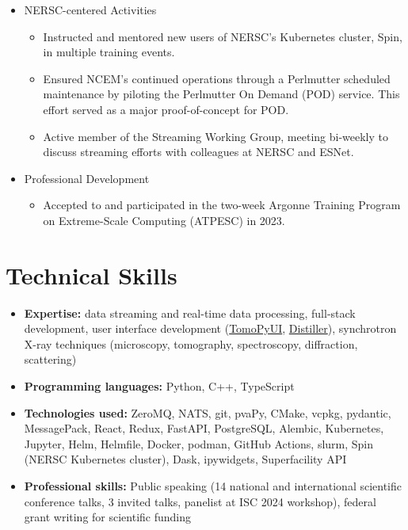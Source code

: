 \documentclass[11pt]{article} %
\begin{document}
\begin{itemize}
  \item NERSC-centered Activities
    \begin{itemize}
      \item Instructed and mentored new users of NERSC's Kubernetes cluster, Spin, in multiple training events.
      \item Ensured NCEM's continued operations through a Perlmutter scheduled maintenance by piloting the Perlmutter On Demand (POD) service. This effort served as a major proof-of-concept for POD.\
      \item Active member of the Streaming Working Group, meeting bi-weekly to discuss streaming efforts with colleagues at NERSC and ESNet.
    \end{itemize}

  \item Professional Development
    \begin{itemize}
      \item Accepted to and participated in the two-week Argonne Training Program on Extreme-Scale Computing (ATPESC) in 2023.
    \end{itemize}
\end{itemize}

\section{Technical Skills}

\begin{itemize}
  \item \textbf{Expertise:} data streaming and real-time data processing, full-stack development, user interface development (\href{https://onlinelibrary.wiley.com/iucr/doi/10.1107/S1600577524003989}{TomoPyUI}, \href{https://github.com/OpenChemistry/distiller}{Distiller}), synchrotron X-ray techniques (microscopy, tomography, spectroscopy, diffraction, scattering)
  \item \textbf{Programming languages:} Python, C++, TypeScript
  \item \textbf{Technologies used:} ZeroMQ, NATS, git, pvaPy, CMake, vcpkg, pydantic, MessagePack, React, Redux, FastAPI, PostgreSQL, Alembic, Kubernetes, Jupyter, Helm, Helmfile, Docker, podman, GitHub Actions, slurm, Spin (NERSC Kubernetes cluster), Dask, ipywidgets, Superfacility API
  \item \textbf{Professional skills:} Public speaking (14 national and international scientific conference talks, 3 invited talks, panelist at ISC 2024 workshop), federal grant writing for scientific funding
\end{itemize}
\end{document}
